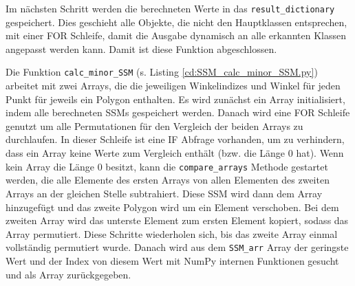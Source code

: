 {	Im nächsten Schritt werden die berechneten Werte in das \lstinline|result_dictionary| gespeichert. Dies geschieht alle Objekte, die nicht den Hauptklassen entsprechen, mit einer FOR Schleife, damit die Ausgabe dynamisch an alle erkannten Klassen angepasst werden kann. Damit ist diese Funktion abgeschlossen. \\
	\ifimportant
	
	\fi

	Die Funktion \lstinline|calc_minor_SSM| \ifimportant (s. Listing \ref{cd:SSM_calc_minor_SSM.py}) \fi arbeitet mit zwei Arrays, die die jeweiligen Winkelindizes und Winkel für jeden Punkt für jeweils ein Polygon enthalten. Es wird zunächst ein Array initialisiert, indem alle berechneten SSMs gespeichert werden. Danach wird eine FOR Schleife genutzt um alle Permutationen für den Vergleich der beiden Arrays zu durchlaufen. In dieser Schleife ist eine IF Abfrage vorhanden, um zu verhindern, dass ein Array keine Werte zum Vergleich enthält (bzw. die Länge 0 hat). Wenn kein Array die Länge 0 besitzt, kann die \lstinline|compare_arrays| Methode gestartet werden, die alle Elemente des ersten Arrays von allen Elementen des zweiten Arrays an der gleichen Stelle subtrahiert. Diese SSM wird dann dem Array hinzugefügt und das zweite Polygon wird um ein Element verschoben. Bei dem zweiten Array wird das unterste Element zum ersten Element kopiert, sodass das Array permutiert. Diese Schritte wiederholen sich, bis das zweite Array einmal vollständig permutiert wurde. Danach wird aus dem \lstinline|SSM_arr| Array der geringste Wert und der Index von diesem Wert mit NumPy internen Funktionen gesucht und als Array zurückgegeben. \\
	\ifimportant
	
	\fi

}
